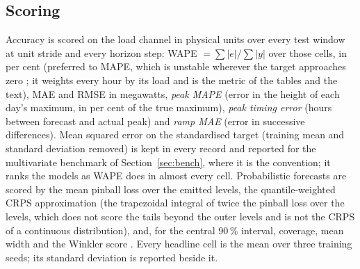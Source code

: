 \subsection{Scoring}
\label{sec:metrics}
Accuracy is scored on the load channel in physical units over every test window at unit
stride and every horizon step: WAPE $=\sum|e|/\sum|y|$ over those cells, in per cent (preferred
to MAPE, which is unstable wherever the target approaches zero \cite{hyndman2006accuracy}; it
weights every hour by its load and is the metric of the tables and the text), MAE and RMSE in
megawatts, \emph{peak MAPE} (error in the height of each day's maximum, in per cent of the true
maximum), \emph{peak timing error} (hours between forecast and actual peak) and \emph{ramp MAE}
(error in successive differences). Mean squared error on the standardised target (training mean
and standard deviation removed) is kept in every record and reported for the multivariate
benchmark of Section~\ref{sec:bench}, where it is the convention; it ranks the models as WAPE
does in almost every cell. Probabilistic forecasts are scored by the mean pinball loss over the
emitted levels, the quantile-weighted CRPS approximation (the trapezoidal integral of twice the
pinball loss over the levels, which does not score the tails beyond the outer levels and is not
the CRPS of a continuous distribution), and, for the central 90\,\% interval, coverage, mean
width and the Winkler score \cite{winkler1972,gneiting2007scoring}. Every headline cell is the
mean over three training seeds; its standard deviation is reported beside it.

